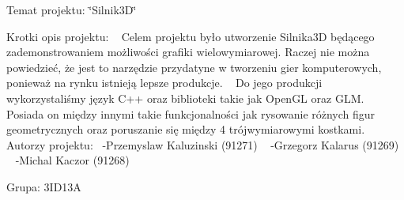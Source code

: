 Temat projektu\+: \char`\"{}\+Silnik3\+D\char`\"{}~\newline
~\newline


Krotki opis projektu\+: ~\newline
 Celem projektu było utworzenie Silnika3D będącego zademonstrowaniem możliwości grafiki wielowymiarowej. Raczej nie można powiedzieć, że jest to narzędzie przydatyne w tworzeniu gier komputerowych, ponieważ na rynku istnieją lepsze produkcje. ~\newline
 Do jego produkcji wykorzystaliśmy język C++ oraz biblioteki takie jak Open\+GL oraz GLM.~\newline
 Posiada on między innymi takie funkcjonalności jak rysowanie różnych figur geometrycznych oraz poruszanie się między 4 trójwymiarowymi kostkami.~\newline
 Autorzy projektu\+:~\newline
 -\/Przemyslaw Kaluzinski (91271) ~\newline
 -\/Grzegorz Kalarus (91269) ~\newline
 -\/Michal Kaczor (91268) ~\newline
~\newline


Grupa\+: 3ID13A 